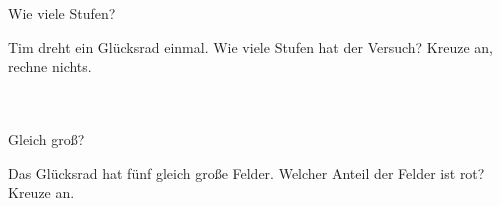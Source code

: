 \setcounter{aufgabe}{10}

\begin{aufgabe}{Wie viele Stufen?}
\begin{teile}
\teil Tim dreht ein Glücksrad einmal. Wie viele Stufen hat der Versuch? Kreuze an, rechne nichts. \\  \\  \\ 
\end{teile}
\end{aufgabe}

\begin{aufgabe}{Gleich groß?}
\begin{teile}
\teil Das Glücksrad hat fünf gleich große Felder. Welcher Anteil der Felder ist rot? Kreuze an. \\  \\ 

\end{teile}
\end{aufgabe}

